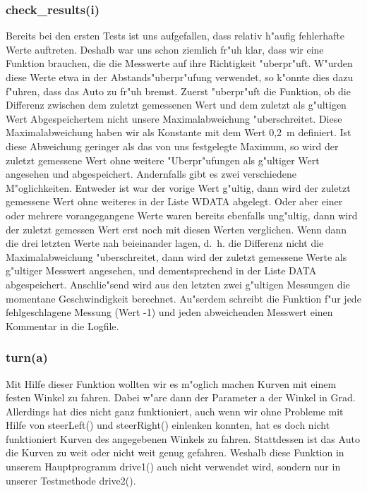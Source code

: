 \documentclass[a4paper,12pt]{article}
\begin{document}
\subsubsection{check\_results(i)}\label{sec2.2.5}

Bereits bei den ersten Tests ist uns aufgefallen, dass relativ h"aufig fehlerhafte Werte auftreten.
Deshalb war uns schon ziemlich fr"uh klar, dass wir eine Funktion brauchen, die die Messwerte auf ihre Richtigkeit "uberpr"uft.
W"urden diese Werte etwa in der Abstands"uberpr"ufung verwendet, so k"onnte dies dazu f"uhren, dass das Auto zu fr"uh bremst.
Zuerst "uberpr"uft die Funktion, ob die Differenz zwischen dem zuletzt gemessenen Wert und dem zuletzt als g"ultigen Wert Abgespeichertem nicht unsere Maximalabweichung "uberschreitet.
Diese Maximalabweichung haben wir als Konstante mit dem Wert 0,2~m definiert.
Ist diese Abweichung geringer als das von uns festgelegte Maximum, so wird der zuletzt gemessene Wert ohne weitere "Uberpr"ufungen als g"ultiger Wert angesehen und abgespeichert.
Andernfalls gibt es zwei verschiedene M"oglichkeiten.
Entweder ist war der vorige Wert g"ultig, dann wird der zuletzt gemessene Wert ohne weiteres in der Liste WDATA abgelegt.
Oder aber einer oder mehrere vorangegangene Werte waren bereits ebenfalls ung"ultig, dann wird der zuletzt gemessen Wert erst noch mit diesen Werten verglichen.
Wenn dann die drei letzten Werte nah beieinander lagen, d.~h. die Differenz nicht die Maximalabweichung "uberschreitet, dann wird der zuletzt gemessene Werte als g"ultiger Messwert angesehen, und dementsprechend in der Liste DATA abgespeichert.
Anschlie"send wird aus den letzten zwei g"ultigen Messungen die momentane Geschwindigkeit berechnet.
Au"serdem schreibt die Funktion f"ur jede fehlgeschlagene Messung (Wert -1) und jeden abweichenden Messwert einen Kommentar in die Logfile.

\subsubsection{turn(a)}\label{sec2.2.6}

Mit Hilfe dieser Funktion wollten wir es m"oglich machen Kurven mit einem festen Winkel zu fahren.
Dabei w"are dann der Parameter a der Winkel in Grad.
Allerdings hat dies nicht ganz funktioniert, auch wenn wir ohne Probleme mit Hilfe von steerLeft() und steerRight() einlenken konnten, hat es doch nicht funktioniert Kurven des angegebenen Winkels zu fahren.
Stattdessen ist das Auto die Kurven zu weit oder nicht weit genug gefahren.
Weshalb diese Funktion in unserem Hauptprogramm drive1() auch nicht verwendet wird, sondern nur in unserer Testmethode drive2().
\end{document}
